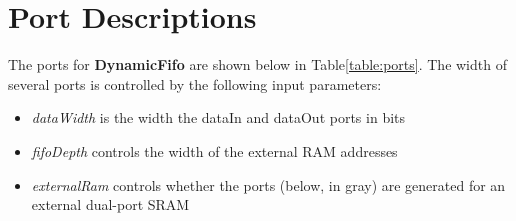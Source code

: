 \section{Port Descriptions}

The ports for \textbf{DynamicFifo} are shown below in 
Table\ref{table:ports}. The width of several ports is controlled 
by the following input parameters:

\begin{itemize}[noitemsep]
  \item \textit{dataWidth} is the width the dataIn and dataOut ports in bits
  \item \textit{fifoDepth} controls the width of the external RAM addresses
  \item \textit{externalRam} controls whether the ports (below, in gray) are 
    generated for an external dual-port SRAM
\end{itemize}
 
